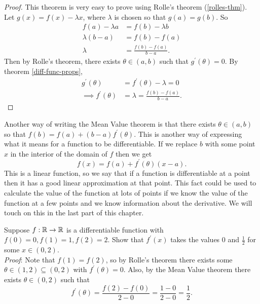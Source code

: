 \documentclass[../real_analysis.tex]{subfiles}
\begin{document}
        \begin{proof}
            This theorem is very easy to prove using Rolle's theorem (\ref{rolles-thm}). Let $g(x)=f(x)-\lambda x$, where $\lambda$ is chosen so that $g(a)=g(b)$. So
            \begin{align*}
                f(a)-\lambda a&=f(b)-\lambda b\\
                \lambda(b-a)&=f(b)-f(a)\\
                \lambda&=\frac{f(b)-f(a)}{b-a}.
            \end{align*}
            Then by Rolle's theorem, there exists $\theta\in(a,b)$ such that $g^\prime(\theta)=0$. By theorem \ref{diff-func-props},
            \begin{align*}
                g^\prime(\theta)&=f^\prime(\theta)-\lambda=0\\
                \implies f^\prime(\theta)&=\lambda=\frac{f(b)-f(a)}{b-a}.
            \end{align*}
        \end{proof}
        Another way of writing the Mean Value theorem is that there exists $\theta\in(a,b)$ so that $f(b)=f(a)+(b-a)f^\prime(\theta)$. This is another way of expressing what it means for a function to be differentiable. If we replace $b$ with some point $x$ in the interior of the domain of $f$ then we get
        \begin{equation*}
            f(x)=f(a)+f^\prime(\theta)(x-a).
        \end{equation*}
        This is a linear function, so we say that if a function is differentiable at a point then it has a good linear approximation at that point. This fact could be used to calculate the value of the function at lots of points if we know the value of the function at a few points and we know information about the derivative. We will touch on this in the last part of this chapter.
        \begin{example}
            Suppose $f:\mathbb{R}\to\mathbb{R}$ is a differentiable function with $f(0)=0,f(1)=1,f(2)=2$. Show that $f^\prime(x)$ takes the values 0 and $\frac{1}{2}$ for some $x\in(0,2)$.\\
            \textit{Proof}: Note that $f(1)=f(2)$, so by Rolle's theorem there exists some $\theta\in(1,2)\subseteq(0,2)$ with $f^\prime(\theta)=0$. Also, by the Mean Value theorem there exists $\theta\in(0,2)$ such that
            \begin{equation*}
                f^\prime(\theta)=\frac{f(2)-f(0)}{2-0}=\frac{1-0}{2-0}=\frac{1}{2}.
            \end{equation*}
        \end{example}
\end{document}
